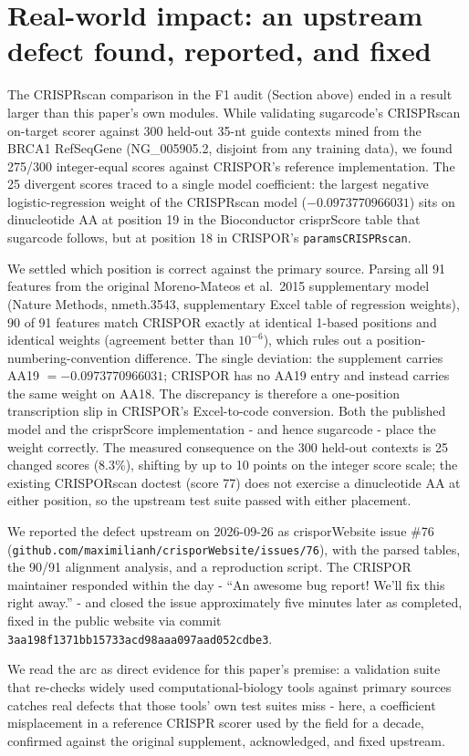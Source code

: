\section{Real-world impact: an upstream defect found, reported, and fixed}
\label{sec:upstream}

The CRISPRscan comparison in the F1 audit (Section above) ended in a result
larger than this paper's own modules. While validating sugarcode's CRISPRscan
on-target scorer against 300 held-out 35-nt guide contexts mined from the
BRCA1 RefSeqGene (NG\_005905.2, disjoint from any training data), we found
275/300 integer-equal scores against CRISPOR's reference implementation. The
25 divergent scores traced to a single model coefficient: the largest
negative logistic-regression weight of the CRISPRscan model
($-0.0973770966031$) sits on dinucleotide AA at position 19 in the
Bioconductor crisprScore table that sugarcode follows, but at position 18 in
CRISPOR's \texttt{paramsCRISPRscan}.

We settled which position is correct against the primary source. Parsing all
91 features from the original Moreno-Mateos et al.\ 2015 supplementary model
(Nature Methods, nmeth.3543, supplementary Excel table of regression weights),
90 of 91 features match CRISPOR exactly at identical 1-based positions and
identical weights (agreement better than $10^{-6}$), which rules out a
position-numbering-convention difference. The single deviation: the supplement
carries AA19 $= -0.0973770966031$; CRISPOR has no AA19 entry and instead
carries the same weight on AA18. The discrepancy is therefore a one-position
transcription slip in CRISPOR's Excel-to-code conversion. Both the published
model and the crisprScore implementation - and hence sugarcode - place the
weight correctly. The measured consequence on the 300 held-out contexts is 25
changed scores (8.3\%), shifting by up to 10 points on the integer score
scale; the existing CRISPORscan doctest (score 77) does not exercise a
dinucleotide AA at either position, so the upstream test suite passed with
either placement.

We reported the defect upstream on 2026-09-26 as crisporWebsite issue \#76
(\texttt{github.com/maximilianh/crisporWebsite/issues/76}), with the
parsed tables, the 90/91 alignment analysis, and a reproduction script. The
CRISPOR maintainer responded within the day - ``An awesome bug report! We'll
fix this right away.'' - and closed the issue approximately five minutes later
as completed, fixed in the public website via commit
\texttt{3aa198f1371bb15733acd98aaa097aad052cdbe3}.

We read the arc as direct evidence for this paper's premise: a validation
suite that re-checks widely used computational-biology tools against primary
sources catches real defects that those tools' own test suites miss - here, a
coefficient misplacement in a reference CRISPR scorer used by the field for a
decade, confirmed against the original supplement, acknowledged, and fixed
upstream.
